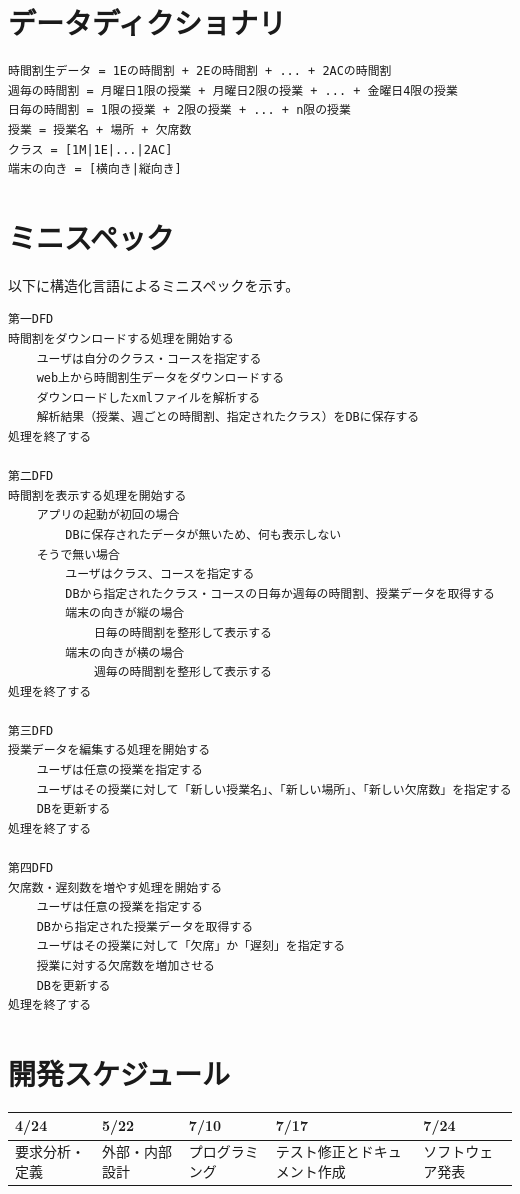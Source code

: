 \documentclass[a4paper,11pt]{jsarticle}
\begin{document}
\section{データディクショナリ}
\begin{verbatim}
時間割生データ = 1Eの時間割 + 2Eの時間割 + ... + 2ACの時間割
週毎の時間割 = 月曜日1限の授業 + 月曜日2限の授業 + ... + 金曜日4限の授業
日毎の時間割 = 1限の授業 + 2限の授業 + ... + n限の授業
授業 = 授業名 + 場所 + 欠席数
クラス = [1M|1E|...|2AC]
端末の向き = [横向き|縦向き]
\end{verbatim}

\section{ミニスペック}
以下に構造化言語によるミニスペックを示す。

\begin{verbatim}
第一DFD
時間割をダウンロードする処理を開始する
    ユーザは自分のクラス・コースを指定する
    web上から時間割生データをダウンロードする
    ダウンロードしたxmlファイルを解析する
    解析結果（授業、週ごとの時間割、指定されたクラス）をDBに保存する
処理を終了する

第二DFD
時間割を表示する処理を開始する
    アプリの起動が初回の場合
        DBに保存されたデータが無いため、何も表示しない
    そうで無い場合
        ユーザはクラス、コースを指定する
        DBから指定されたクラス・コースの日毎か週毎の時間割、授業データを取得する
        端末の向きが縦の場合
            日毎の時間割を整形して表示する
        端末の向きが横の場合
            週毎の時間割を整形して表示する
処理を終了する

第三DFD
授業データを編集する処理を開始する
    ユーザは任意の授業を指定する
    ユーザはその授業に対して「新しい授業名」、「新しい場所」、「新しい欠席数」を指定する
    DBを更新する
処理を終了する

第四DFD
欠席数・遅刻数を増やす処理を開始する
    ユーザは任意の授業を指定する
    DBから指定された授業データを取得する
    ユーザはその授業に対して「欠席」か「遅刻」を指定する
    授業に対する欠席数を増加させる
    DBを更新する
処理を終了する
\end{verbatim}

\section{開発スケジュール}

\begin{table}[H]
\begin{tabular}{|l|l|l|l|l|} \hline
4/24 & 5/22 & 7/10 & 7/17 & 7/24 \\ \hline
要求分析・定義 & 外部・内部設計 & プログラミング & テスト修正とドキュメント作成 & ソフトウェア発表 \\ \hline
\end{tabular}
\end{table}
\end{document}

